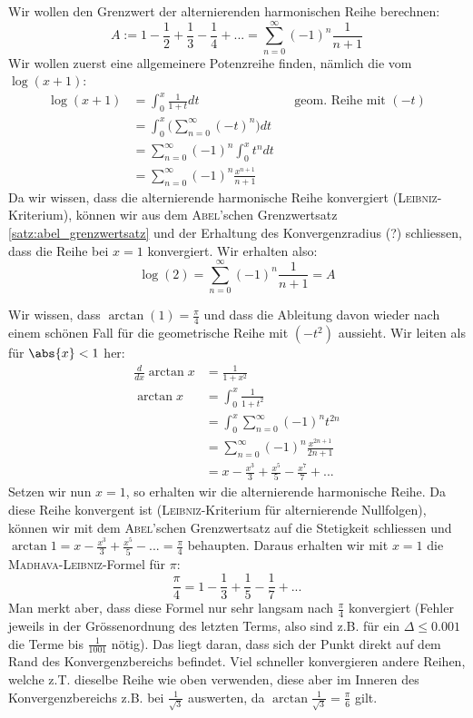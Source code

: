 \begin{example} Wir wollen den Grenzwert der alternierenden harmonischen Reihe berechnen:
$$A := 1 - \frac{1}{2} + \frac{1}{3} - \frac{1}{4} + ... = \sum_{n=0}^\infty (-1)^{n} \frac{1}{n+1}$$
Wir wollen zuerst eine allgemeinere Potenzreihe finden, nämlich die vom $\log(x+1)$:
\begin{align*}
    \log(x+1)&=\int_0^x\frac{1}{1+t}dt &&\text{geom. Reihe mit }(-t)\\
        &=\int_0^x\Big(\sum_{n=0}^\infty (-t)^n \Big) dt\\
        &=\sum_{n=0}^\infty (-1)^n \int_0^xt^n dt\\
        &=\sum_{n=0}^\infty (-1)^n \frac{x^{n+1}}{n+1}
\end{align*}
Da wir wissen, dass die alternierende harmonische Reihe konvergiert (\textsc{Leibniz}-Kriterium), können wir aus dem \textsc{Abel}'schen Grenzwertsatz \ref{satz:abel_grenzwertsatz} und der Erhaltung des Konvergenzradius (?) schliessen, dass die Reihe bei $x=1$ konvergiert. Wir erhalten also:
$$\log(2)=\sum_{n=0}^\infty (-1)^n \frac{1}{n+1} = A$$
\end{example}

\begin{example} Wir wissen, dass $\arctan(1) = \frac{\pi}{4}$ und dass die Ableitung davon wieder nach einem schönen Fall für die geometrische Reihe mit $(-t^2)$ aussieht. Wir leiten als für $\abs{x} < 1$ her:
\begin{align*}
    \frac{d}{dx}\arctan x &= \frac{1}{1+x^2}\\
    \arctan x &= \int_0^x \frac{1}{1+t^2}\\
        &= \int_0^x \sum_{n=0}^\infty (-1)^n t^{2n}\\
        &= \sum_{n=0}^\infty (-1)^n \frac{x^{2n+1}}{2n+1}\\
        &= x - \frac{x^3}{3} + \frac{x^5}{5} - \frac{x^7}{7} +...
\end{align*}
Setzen wir nun $x=1$, so erhalten wir die alternierende harmonische Reihe. Da diese Reihe konvergent ist (\textsc{Leibniz}-Kriterium für alternierende Nullfolgen), können wir mit dem \textsc{Abel}'schen Grenzwertsatz auf die Stetigkeit schliessen und $\arctan 1 = x - \frac{x^3}{3} + \frac{x^5}{5} -... = \frac{\pi}{4}$ behaupten. Daraus erhalten wir mit $x=1$ die \textsc{Madhava-Leibniz}-Formel für $\pi$:
$$\frac{\pi}{4} = 1 - \frac{1}{3} + \frac{1}{5} - \frac{1}{7} +...$$
Man merkt aber, dass diese Formel nur sehr langsam nach $\frac{\pi}{4}$ konvergiert (Fehler jeweils in der Grössenordnung des letzten Terms, also sind z.B.  für ein $\Delta \leq 0.001$ die Terme bis $\frac{1}{1001}$ nötig). Das liegt daran, dass sich der Punkt direkt auf dem Rand des Konvergenzbereichs befindet. Viel schneller konvergieren andere Reihen, welche z.T. dieselbe Reihe wie oben verwenden, diese aber im Inneren des Konvergenzbereichs z.B. bei $\frac{1}{\sqrt{3}}$ auswerten, da $\arctan \frac{1}{\sqrt{3}} = \frac{\pi}{6}$ gilt.
\end{example}

